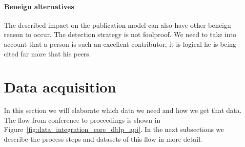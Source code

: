 \documentclass{ou-report}
\begin{document}
\paragraph{Beneign alternatives}
The described impact on the publication model can also have other beneign reason 
to occur. The detection strategy is not foolproof. We need to take into account 
that a person is such an excellent contributor, it is logical he is being cited
far more that his peers.

\section{Data acquisition}
In this section we will elaborate which data we need and how we get that data.
The flow from conference to proceedings is shown in
Figure~\ref{fig:data_integration_core_dblp_api}. In the next subsections we 
describe the process steps and datasets of this flow in more detail.

\end{document}
